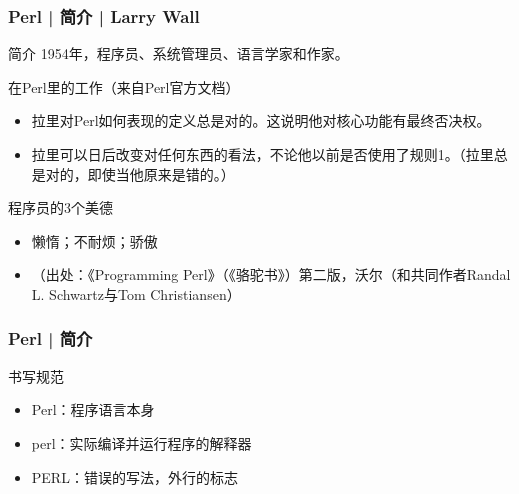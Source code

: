 \begin{frame}
  \frametitle{Perl | 简介 | Larry Wall}
  \begin{block}{简介}
    1954年，程序员、系统管理员、语言学家和作家。
  \end{block}
  \pause
  \begin{block}{在Perl里的工作（来自Perl官方文档）}
    \begin{itemize}
      \item 拉里对Perl如何表现的定义总是对的。这说明他对核心功能有最终否决权。
      \item 拉里可以日后改变对任何东西的看法，不论他以前是否使用了规则1。（拉里总是对的，即使当他原来是错的。）
    \end{itemize}
  \end{block}
  \pause
  \begin{block}{程序员的3个美德}
    \begin{itemize}
      \item 懒惰；不耐烦；骄傲
      \item （出处：《Programming Perl》（《骆驼书》）第二版，沃尔（和共同作者Randal L.  Schwartz与Tom Christiansen）
    \end{itemize}
  \end{block}
\end{frame}

\begin{frame}
  \frametitle{Perl | 简介}
  \begin{block}{\alert{书写规范}}
    \begin{itemize}
      \item Perl：程序语言本身
      \item perl：实际编译并运行程序的解释器
      \item PERL：错误的写法，外行的标志
    \end{itemize}
  \end{block}
\end{frame}

